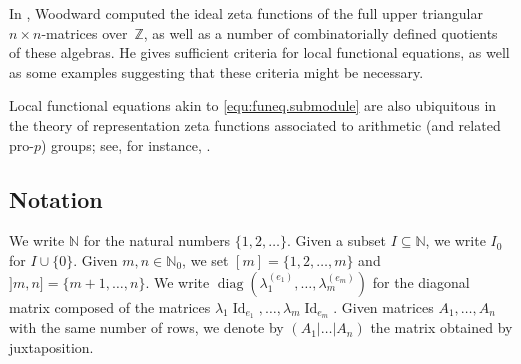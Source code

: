 \documentclass[11pt]{amsart}
\numberwithin{equation}{section}
\numberwithin{figure}{section}
\theoremstyle{plain}
\theoremstyle{definition}
\theoremstyle{remark}
\begin{document}
In \cite{Woodward/08}, Woodward computed the ideal zeta functions of
the full upper triangular $n\times n$-matrices over~${\ensuremath{\mathbb{Z}}}$, as well as a
number of combinatorially defined quotients of these algebras. He
gives sufficient criteria for local functional equations, as well as
some examples suggesting that these criteria might be necessary.

Local functional equations akin to \eqref{equ:funeq.submodule} are
also ubiquitous in the theory of representation zeta functions
associated to arithmetic (and related pro-$p$) groups; see, for
instance, \cite{AKOVI/13,StasinskiVoll/14}.

\iffalse{\subsection{Soluble algebras}
The only computations of submodule zeta functions associated to
soluble, nonnilpotent algebras of endomorphisms we are aware of are
those of ideal zeta functions of soluble Lie lattices. 

\subsection{Integral representations of finite
  groups}\label{subsec:solomon} Solomon's work on submodule zeta
functions for semisimple algebras is a classical predecessor and
counterpart of the present paper. Given a finite group $G$ and a
${\ensuremath{\mathbb{Z}}}[G]$-lattice ${\ensuremath{\mathcal{L}}}$ inside a ${\ensuremath{\mathbb{Q}}}[G]$-module $V$, Solomon studied
the submodule zeta function $\zeta_{{\ensuremath{\mathbb{Z}}}[G]{\curvearrowright} {\ensuremath{\mathcal{L}}}}(s)$ in
\cite{Solomon/77}. It turns out that these zeta functions are
``almost'', i.e.\ apart from finitely many Euler factors, products of
translates of Dedekind zeta functions of number fields featuring in
the Wedderburn decomposition of the semisimple algebra~${\ensuremath{\mathbb{Q}}}[G]$. In
particular, $\zeta_{{\ensuremath{\mathbb{Z}}}[G]{\curvearrowright} {\ensuremath{\mathcal{L}}}}(s)$ is an Euler product, whose
factors are indexed by the rational prime numbers. For almost all $p$,
the relevant Euler factor is a rational function in $p^{-s}$ of a
comparatively simple form, depending only on combinatorial data
globally determined by $V$ and the rational primes' decomposition
types in the various relevant number fields.}\fi

\subsection{Notation}\label{subsec:not}
We write ${\ensuremath{\mathbb{N}}}$ for the natural numbers $\{1,2,\dots\}$. Given a subset
$I\subseteq {\ensuremath{\mathbb{N}}}$, we write $I_0$ for $I\cup\{0\}$. Given $m,n\in{\ensuremath{\mathbb{N}}}_0$,
we set $[m]=\{1,2,\dots,m\}$ and $]m,n]=\{m+1,\dots,n\}$. We write
$\operatorname{diag}\left( \lambda_1^{(e_1)},\dots,\lambda_m^{(e_m)} \right)$ for
the diagonal matrix composed of the matrices $\lambda_1
\operatorname{Id}_{e_1},\dots,\lambda_m\operatorname{Id}_{e_m}$. Given matrices $A_1,\dots,A_n$
with the same number of rows, we denote by $(A_1| \dots | A_n)$ the
matrix obtained by juxtaposition.
\end{document}
